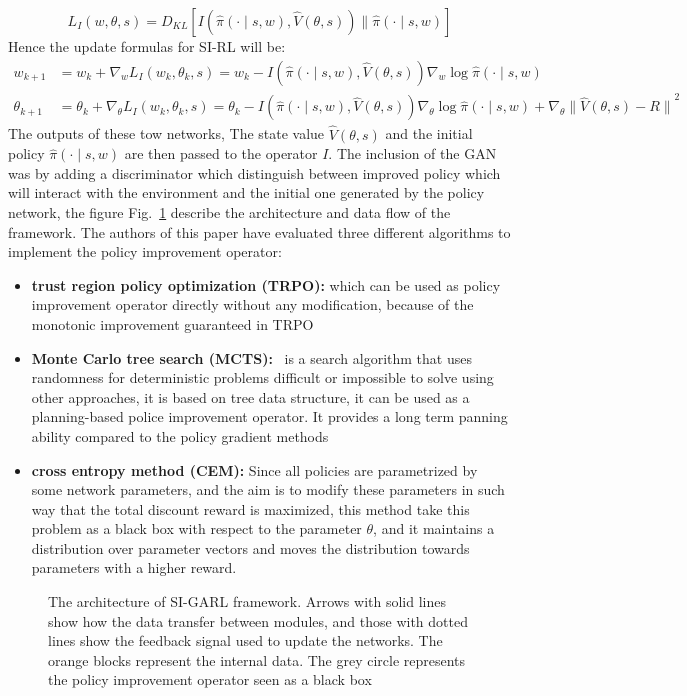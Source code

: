 \begin{equation}
L_I(w,\theta,s) = D_{KL}[I(\hat{\pi}(\cdotp \mid s,w),\hat{V}(\theta,s))\parallel \hat{\pi}(\cdotp \mid s,w)]
\end{equation}
Hence the update formulas for SI-RL will be:
\begin{align}
\nonumber w_{k+1} &= w_k + \nabla_w L_I(w_k, \theta_k,s) = w_k - I(\hat{\pi}(\cdotp \mid s,w),\hat{V}(\theta,s))\nabla_w \log{\hat{\pi}(\cdotp \mid s,w)}\\
\nonumber \theta_{k+1} &= \theta_k + \nabla_\theta L_I(w_k, \theta_k,s) = \theta_k - I(\hat{\pi}(\cdotp \mid s,w),\hat{V}(\theta,s))\nabla_\theta \log{\hat{\pi}(\cdotp \mid s,w)} + \nabla_\theta {\parallel \hat{V}(\theta,s) - R \parallel}^2
\label{eq:update_SI_RL}
\end{align}
The outputs of these tow networks, The state value $\hat{V}(\theta,s)$ and the initial policy $ \hat{\pi}(\cdotp \mid s,w)$ are then passed to the operator $I$. The inclusion of the GAN was by adding a discriminator which distinguish between improved policy which will interact with the environment and the initial one generated by the policy network, the figure Fig.~\ref{fig:SIGARL} describe the architecture and data flow of the framework. The authors of this paper have evaluated three different algorithms to implement the policy improvement operator:
\begin{itemize}
	\item \textbf{ trust region policy optimization (TRPO):}  which can be used as policy improvement operator directly without any modification, because of the monotonic improvement guaranteed in TRPO
	\item \textbf{Monte Carlo tree search (MCTS):}~\cite{browne2012survey} is a search algorithm that uses randomness for deterministic problems difficult or impossible to solve using other approaches, it is based on tree data structure, it can be used as
	a planning-based police improvement operator. It provides a long term panning ability compared to the policy gradient methods
	\item \textbf{cross entropy
		method (CEM):} Since all policies are parametrized by some network parameters, and the aim is to modify these parameters in such way that the total discount reward is maximized, this method take this problem as a black box with respect to the parameter $\theta$, and it maintains
	a distribution over parameter vectors and moves the distribution
	towards parameters with a higher reward.
\end{itemize}
\begin{figure}
	\centerline
	\SIGARL
	\caption{The architecture of SI-GARL framework. Arrows with solid lines show how the data transfer between modules, and
	those with dotted lines show the feedback signal used to update the networks. The orange blocks represent the internal data.
	The grey circle represents the policy improvement operator seen as a black box}
	\label{fig:SIGARL}
\end{figure}

